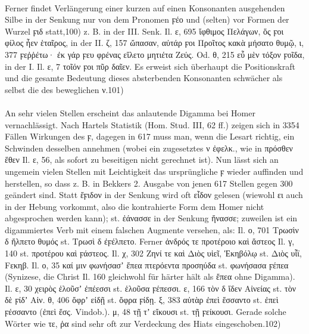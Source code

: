 \paragraph{} Ferner findet Verlängerung einer kurzen auf einen Konsonanten
  ausgehenden Silbe in der Senkung nur von dem Pronomen ϝέο und (selten) vor
  Formen der Wurzel ϝιδ statt,100) z. B. in der III. Senk. Il. ε, 695 ἴφθιμος
  Πελάγων, ὅς ϝοι φίλος ἦεν ἑταῖρος, in der II. ζ, 157 ὤπασαν, αὐτάρ ϝοι Προῖτος
  κακὰ μήσατο θυμῷ, ι, 377 ϝεῤῥέτω· ἐκ γάρ ϝευ φρένας εἵλετο μητιέτα Ζεύς. Od.
  θ, 215 εὖ μὲν τόξον ϝοῖδα, in der I. Il. ε, 7 τοῖόν ϝοι πῦρ δαῖεν. Es erweist
  sich überhaupt die Positionskraft und die gesamte Bedeutung dieses
  absterbenden Konsonanten schwächer als selbst die des beweglichen ν.101)

  \paragraph{} An sehr vielen Stellen erscheint das anlautende Digamma bei Homer vernachlässigt.
  Nach Hartels Statistik (Hom. Stud. III, 62 ff.) zeigen sich in 3354 Fällen
  Wirkungen des ϝ, dagegen in 617 muss man, wenn die Lesart richtig, ein
  Schwinden desselben annehmen (wobei ein zugesetztes ν ἐφελκ., wie in πρόσθεν
  ἕθεν Il. ε, 56, als sofort zu beseitigen nicht gerechnet ist). Nun lässt sich
  an ungemein vielen Stellen mit Leichtigkeit das ursprüngliche ϝ wieder
  auffinden und herstellen, so dass z. B. in Bekkers 2. Ausgabe von jenen 617
  Stellen gegen 300 geändert sind. Statt ἔϝιδον in der Senkung wird oft εἶδον
  gelesen (wiewohl ει auch in der Hebung vorkommt, also die kontrahierte Form
  dem Homer nicht abgesprochen werden kann); st. ἐάνασσε in der Senkung ἤνασσε;
  zuweilen ist ein digammiertes Verb mit einem falschen Augmente versehen, als:
  Il. ο, 701 Τρωσὶν δ ἤλπετο θυμός st. Τρωσὶ δ ἐϝέλπετο. Ferner ἀνδρός τε
  προτέροιο καὶ ἄστεος Il. γ, 140 st. προτέρου καὶ ϝάστεος. Il. χ, 302 Ζηνί τε
  καὶ Διὸς υἱεῖ, Ἑκηβόλῳ st. Διὸς υἷϊ, Fεκηβ. Il. ο, 35 καί μιν φωνήσασʼ ἔπεα
  πτερόεντα προσηύδα st. φωνήσασα ϝέπεα (Synizese, die Christ Il. 160 gleichwohl
  für härter hält als ἔπεα ohne Digamma). Il. ε, 30 χειρὸς ἑλοῦσʼ ἐπέεσσι st.
  ἑλοῦσα ϝέπεσσι. ε, 166 τὸν δ ἴδεν Αἰνείας st. τὸν δὲ ϝίδʼ Αἰν. θ, 406 ὄφρʼ
  εἰδῇ st. ὄφρα ϝίδῃ. ξ, 383 αὐτὰρ ἐπεὶ ἕσσαντο st. ἐπεὶ ϝέσσαντο (ἐπεὶ ἕσς.
  Vindob.). μ, 48 τῇ τʼ εἴκουσι st. τῇ ϝείκουσι. Gerade solche Wörter wie τε, ῥα
  sind sehr oft zur Verdeckung des Hiats eingeschoben.102) 

